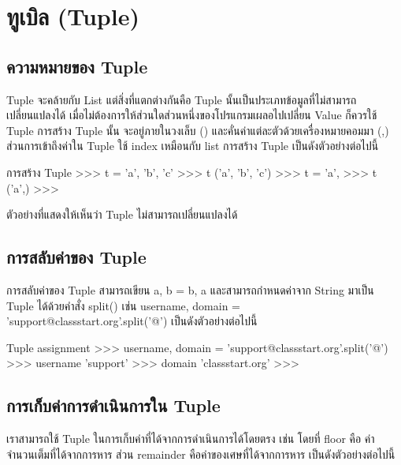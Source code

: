 \chapter{ทูเบิล (Tuple)}
\section{ความหมายของ Tuple}

Tuple จะคล้ายกับ List แต่สิ่งที่แตกต่างกันคือ Tuple นั้นเป็นประเภทข้อมูลที่ไม่สามารถเปลี่ยนแปลงได้ เมื่อไม่ต้องการให้ส่วนใดส่วนหนึ่งของโปรแกรมเผลอไปเปลี่ยน Value ก็ควรใช้ Tuple การสร้าง Tuple นั้น จะอยู่ภายในวงเล็บ () และคั่นค่าแต่ละตัวด้วยเครื่องหมายคอมมา (,) ส่วนการเข้าถึงค่าใน Tuple ใช้ index เหมือนกับ list การสร้าง Tuple เป็นดังตัวอย่างต่อไปนี้

\begin{codelist}{การสร้าง Tuple}{}
>>> t = 'a', 'b', 'c'
>>> t
('a', 'b', 'c')
>>> t = 'a',
>>> t
('a',)
>>>
\end{codelist}

ตัวอย่างที่แสดงให้เห็นว่า Tuple ไม่สามารถเปลี่ยนแปลงได้



\section{การสลับค่าของ Tuple}

การสลับค่าของ Tuple สามารถเขียน a, b = b, a และสามารถกำหนดค่าจาก String มาเป็น Tuple ได้ด้วยคำสั่ง split() เช่น username, domain = 'support@classstart.org'.split('@') เป็นดังตัวอย่างต่อไปนี้

\begin{codelist}{Tuple assignment}{}
>>> username, domain = 'support@classstart.org'.split('@')
>>> username
'support'
>>> domain
'classstart.org'
>>>
\end{codelist}


\section{การเก็บค่าการดำเนินการใน Tuple}

เราสามารถใช้ Tuple ในการเก็บค่าที่ได้จากการดำเนินการได้โดยตรง เช่น   โดยที่ floor คือ ค่าจำนวนเต็มที่ได้จากการหาร ส่วน remainder คือค่าของเศษที่ได้จากการหาร เป็นดังตัวอย่างต่อไปนี้

